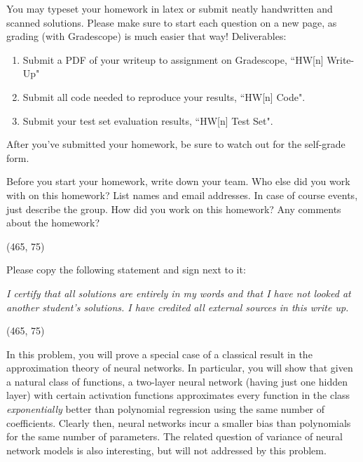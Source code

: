 
You may typeset your homework in latex or submit neatly handwritten and scanned solutions. Please make sure to start each question on a new page, as grading (with Gradescope) is much easier that way! Deliverables:

\begin{enumerate}
  \item Submit a PDF of your writeup to assignment on Gradescope, ``HW[n] Write-Up"
  \item Submit all code needed to reproduce your results, ``HW[n] Code".
  \item Submit your test set evaluation results, ``HW[n] Test Set".
\end{enumerate}

After you've submitted your homework, be sure to watch out for the self-grade form.

\begin{Parts}

\Part Before you start your homework, write down your team. Who else did you work with on this homework? List names and email addresses. In case of course events, just describe the group. How did you work on this homework? Any comments about the homework?

\vspace{15pt}
\framebox(465, 75){}

\Part Please copy the following statement and sign next to it:

\textit{I certify that all solutions are entirely in my words and that I have not looked at another student's solutions. I have credited all external sources in this write up.}

\vspace{15pt}
\framebox(465, 75){}

\end{Parts}

\pagebreak

\newcommand{\cl}{\ensuremath{{\sf cl}}}
\newcommand{\conv}{\ensuremath{{\sf \overline{conv}}}}

In this problem, you will prove a special case of a classical result in the approximation theory of neural networks. In particular, you will show that given a natural class of functions, a two-layer neural network (having just one hidden layer) with certain activation functions approximates every function in the class \emph{exponentially} better than polynomial regression using the same number of coefficients. Clearly then, neural networks incur a smaller bias than polynomials for the same number of parameters. The related question of variance of neural network models is also interesting, but will not addressed by this problem.

